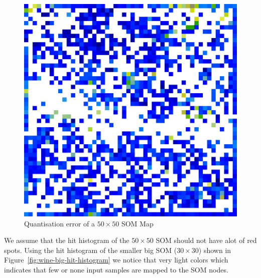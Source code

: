 \documentclass{acm_proc_article-sp}
\begin{document}
\begin{figure}
\centering
\includegraphics[width=\linewidth]{img/wine-big-mean-quant-error}
\caption{Quantisation error of a $50\times50$ SOM Map}
\label{fig:wine-big-mean-quant-error}
\end{figure}

We assume that the hit histogram of the $50\times50$ SOM should not have alot of red spots.
Using the hit histogram of the smaller big SOM ($30\times30$) shown in Figure~\ref{fig:wine-big-hit-histogram} we notice that very light
colors which indicates that few or none input samples are mapped to the SOM nodes.
\end{document}
